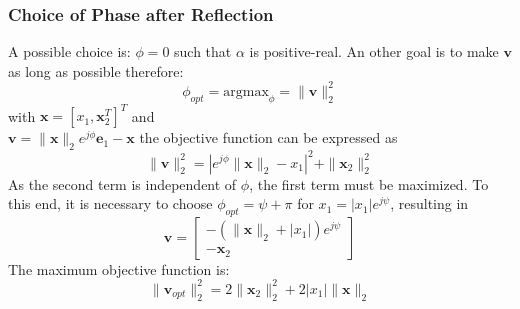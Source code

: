 \documentclass[english]{latex4ei/latex4ei_sheet}
\begin{document}
\begin{sectionbox}
    \subsubsection{Choice of Phase after Reflection}

    A possible choice is: $\phi=0$ such that $\alpha$ is positive-real.
    An other goal is to make $\mathbf{v}$ as long as possible therefore:
    $$\phi_{opt} = \text{argmax}_{\phi} = \parallel \mathbf{v}\parallel_2^2$$
    with $\mathbf{x} = [x_1, \mathbf{x}_2^T]^T$ and \\
    $\mathbf{v} = \parallel \mathbf{x}\parallel_2 e^{j\phi}\mathbf{e}_1 - \mathbf{x}$ the objective function can be expressed as
    $$\parallel \mathbf{v} \parallel_2^2 = |e^{j\phi}\parallel\mathbf{x}\parallel_2 - x_1|^2 + \parallel \mathbf{x}_2 \parallel_2^2$$
    As the second term is independent of $\phi$, the first term must be maximized. To this end, it is necessary to choose $\phi_{opt}=\psi+\pi$ for $x_1 = |x_1|e^{j\psi}$, resulting in
    $$\mathbf{v} = \begin{bmatrix}
            -(\parallel\mathbf{x}\parallel_2 + |x_1|)e^{j\psi} \\
            -\mathbf{x}_2
        \end{bmatrix}$$
    The maximum objective function is:
    $$\parallel\mathbf{v}_{opt}\parallel_2^2 = 2\parallel\mathbf{x}_2\parallel_2^2 + 2|x_1|\parallel\mathbf{x}\parallel_2$$

\end{sectionbox}
\end{document}
